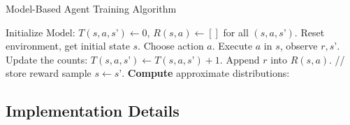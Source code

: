 \documentclass{article}
\begin{document}
\begin{algorithm}[H]
\caption{Model-Based Agent Training Algorithm}
\begin{algorithmic}[1]
\STATE Initialize $\mathrm{Model}$: $T(s,a,s’) \leftarrow 0$, $R(s,a) \leftarrow []$ for all $(s,a,s’)$.
\STATE Reset environment, get initial state $s$.
\STATE Choose action $a$.
\STATE Execute $a$ in $s$, observe $r, s’$.
\STATE Update the counts: $T(s,a,s’) \leftarrow T(s,a,s’) + 1$.
\STATE Append $r$ into $R(s,a)$. \quad // store reward sample
\STATE $s \leftarrow s’$.
\ENDWHILE
\ENDFOR
\STATE \textbf{Compute} approximate distributions:
\end{algorithmic}
\end{algorithm}

\subsection{Implementation Details}
\end{document}
